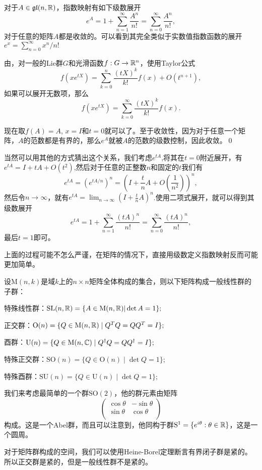 \para 对于$A\in\mathfrak{gl}(n,\mathbb{R})$，指数映射有如下级数展开
\[
	e^A=1+\sum_{n=1}^\infty \frac{A^n}{n!}=\sum_{n=0}^\infty \frac{A^n}{n!},
\]
对于任意的矩阵$A$都是收敛的。可以看到其完全类似于实数值指数函数的展开$e^x=\sum_{n=0}^\infty x^n/n!$

\proof 由，对一般的Lie群$G$和光滑函数$f:G\to \mathbb{R}^n$，使用Taylor公式
\[
	f(xe^{tX})=\sum_{k=0}^n\frac{(tX)^{k}}{k!}f(x)+O(t^{n+1}),
\]
如果可以展开无数项，那么
\[
	f(xe^{tX})=\sum_{k=0}^\infty\frac{(tX)^{k}}{k!}f(x).
\]

现在取$f(A)=A$, $x=I$和$t=0$就可以了。至于收敛性，因为对于任意一个矩阵，$A$的范数都是有界的，那么$e^A$就被$A$的范数的级数控制，因此收敛。\qed

当然可以用其他的方式猜出这个关系，我们考虑$e^{tA}$,将其在$t=0$附近展开，有$e^{tA}=I+tA+O(t^2)$,然后对于任意的正整数$n$和固定的$t$我们有
\[
	e^{tA}=\left(e^{tA/n}\right)^n=\left(I+\frac{t}{n}A+O\left(\frac{1}{n^2}\right)\right)^n,
\]
然后令$n\to\infty$，就有$e^{tA}=\lim_{n\to\infty}\left(I+\frac{t}{n}A\right)^n$.使用二项式展开，就可以得到其级数展开
\[
	e^{tA}=1+\sum_{n=1}^\infty \frac{(tA)^n}{n!}=\sum_{n=0}^\infty \frac{(tA)^n}{n!},
\]
最后$t=1$即可。

上面的过程可能不怎么严谨，在矩阵的情况下，直接用级数定义指数映射反而可能更加简单。

\para 设$\mathrm{M}(n,k)$是域$k$上的$n\times n$矩阵全体构成的集合，则以下矩阵构成一般线性群的子群：

 特殊线性群：$\mathrm{SL}(n,\mathbb{R})=\{A\in \mathrm{M}(n,\mathbb{R})|\det A=1\};$

 正交群：$\mathrm{O}(n) = \{ Q \in \mathrm{M}(n,\mathbb{R}) \mid Q^T Q = Q Q^T = I \};$

 酉群：$\mathrm{U}(n) = \{ Q \in \mathrm{M}(n,\mathbb{C}) \mid Q^\dag Q = Q Q^\dag = I \};$

 特殊正交群：$\mathrm{SO}(n) =\{ Q \in \mathrm{O}(n) \mid \det Q=1 \};$

 特殊酉群：$\mathrm{SU}(n) =\{ Q \in \mathrm{U}(n) \mid \det Q=1 \};$

我们来考虑最简单的一个群$\mathrm{SO}(2)$，他的群元素由矩阵
\[
	\begin{pmatrix}
	\cos \theta&-\sin \theta\\
	\sin \theta&\cos \theta\\
	\end{pmatrix}
\]
构成。这是一个Abel群，而且可以注意到，他同构于群$\mathrm{S}^1=\{e^{i\theta}:\theta\in\mathbb{R}\}$，这是一个圆周。

\pro 对于矩阵群构成的空间，我们可以使用Heine-Borel定理断言有界闭子群是紧的。所以正交群是紧的，但是一般线性群不是紧的。

